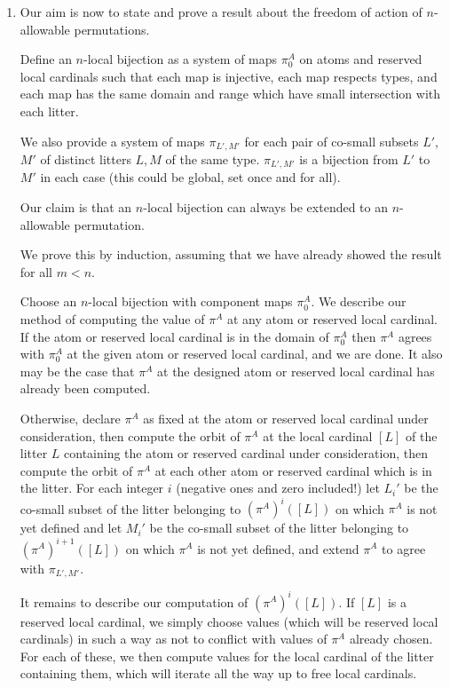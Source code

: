 \documentclass[12pt]{article}
\begin{document}
\begin{enumerate}
\begin{enumerate}
\end{enumerate}

\item  Our aim is now to state and prove a result about the freedom of action of $n$-allowable permutations.

Define an $n$-local bijection as a system of maps $\pi^A_0$ on atoms and reserved local cardinals such that each map is injective, each map respects types, and each map has the same domain and range which have small intersection with each litter.

We also provide a system of maps $\pi_{L',M'}$ for each pair of co-small subsets $L'$, $M'$ of distinct litters $L,M$ of the same type.  $\pi_{L',M'}$ is a bijection from $L'$ to $M'$ in each case (this could be global, set once and for all).

Our claim is that an $n$-local bijection can always be extended to an $n$-allowable permutation.

We prove this by induction, assuming that we have already showed the result for all $m<n$.

Choose an $n$-local bijection with component maps $\pi^A_0$.  We describe our method of computing the value of $\pi^A$ at any atom or reserved local cardinal.  If the atom or reserved local cardinal is in the domain
of $\pi^A_0$ then $\pi^A$ agrees with $\pi^A_0$ at the given atom or reserved local cardinal, and we are done.  It also may be the case that $\pi^A$ at the designed atom or reserved local cardinal
has already been computed.

Otherwise, declare $\pi^A$ as fixed at the atom or reserved local cardinal under consideration, then compute the orbit of $\pi^A$ at the local cardinal $[L]$ of the litter $L$ containing the
atom or reserved cardinal under consideration, then compute the orbit of $\pi^A$ at each other atom or reserved cardinal which is in the litter.  For each integer $i$ (negative ones and zero included!)
let $L_i'$ be the co-small subset of the litter belonging to $(\pi^A)^i([L])$ on which $\pi^A$ is not yet defined and let $M_i'$ be  the co-small subset of the litter belonging to $(\pi^A)^{i+1}([L])$ on which $\pi^A$ is not yet defined, and extend $\pi^A$ to agree with $\pi_{L',M'}$.

It remains to describe our computation of $(\pi^A)^i([L])$.  If $[L]$ is a reserved local cardinal, we simply choose values (which will be reserved local cardinals)  in such a way as not to conflict with values of $\pi^A$ already chosen.  For each of these, we then compute values for the local cardinal of the litter containing them, which will iterate all the way up to free local cardinals.


\end{enumerate}
\end{document}
